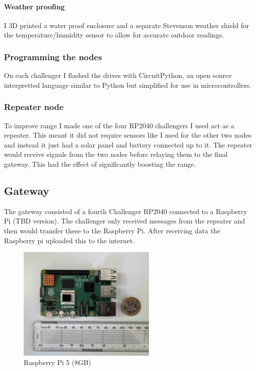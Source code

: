 \paragraph{Weather proofing}

I 3D printed a water proof enclosure and a separate Stevenson weather shield for
the temperature/humidity sensor to allow for accurate outdoor readings.

\subsubsection{Programming the nodes}

On each challenger I flashed the drives with CircuitPython, an open source
interpretted language similar to Python but simplified for use in
microcontrollers.

\subsubsection{Repeater node}

To improve range I made one of the four RP2040 challengers I used act as a
repeater. This meant it did not require sensors like I used for the other two
nodes and instead it just had a solar panel and battery connected up to it. The
repeater would receive signals from the two nodes before relaying them to the
final gateway. This had the effect of significantly boosting the range.

\subsection{Gateway}

The gateway consisted of a fourth Challenger RP2040 connected to a Raspberry Pi
(TBD version). The challenger only received messages from the repeater and
then would transfer these to the Raspberry Pi. After receiving data the
Raspberry pi uploaded this to the internet.

\begin{figure}[H]
    \centering
    \includegraphics[width=0.6\textwidth]{contents/part-2/fig2/raspberry-pi.jpg}
    \caption{Raspberry Pi 5 (8GB)}
    \label{fig:raspberry-pi}
\end{figure}

